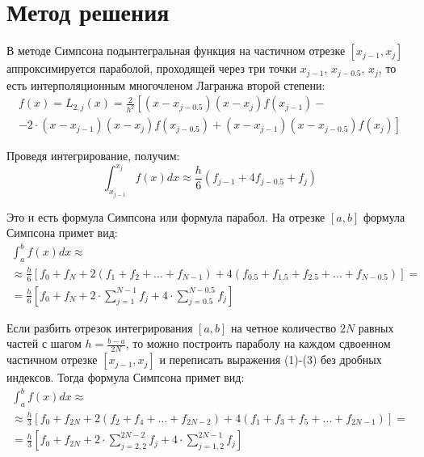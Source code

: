 \documentclass{report}
\begin{document}
\section*{Метод решения}
В методе Симпсона подынтегральная функция на частичном отрезке $\left[x_{j-1}, x_{j}\right]$ аппроксимируется параболой, проходящей через три точки $x_{j-1}$, $x_{j-0.5}$, $x_{j}$, то есть интерполяционным многочленом Лагранжа второй степени:
\begin{equation}
\begin{array}{l}
f(x)=L_{2, j}(x)=\frac{2}{h^{2}}\left[\left(x-x_{j-0.5}\right)\left(x-x_{j}\right) f\left(x_{j-1}\right)-\right. \\
\left.-2 \cdot\left(x-x_{j-1}\right)\left(x-x_{j}\right) f\left(x_{j-0.5}\right)+\left(x-x_{j-1}\right)\left(x-x_{j-0.5}\right) f\left(x_{j}\right)\right]
\end{array}
\end{equation}
\par Проведя интегрирование, получим:
\begin{equation}
\int_{x_{j-1}}^{x_{j}} f(x) d x \approx \frac{h}{6}\left(f_{j-1}+4 f_{j-0.5}+f_{j}\right)
\end{equation}
\par Это и есть формула Симпсона или формула парабол. На отрезке $[a,b]$ формула Симпсона примет вид:
\begin{equation}
\begin{array}{l}
\int_{a}^{b} f(x) d x \approx \\
\approx\frac{h}{6}\left[f_{0}+f_{N}+2\left(f_{1}+f_{2}+\ldots+f_{N-1}\right)+4\left(f_{0.5}+f_{1.5}+f_{2.5}+\ldots+f_{N-0.5}\right)\right]= \\
=\frac{h}{6}\left[f_{0}+f_{N}+2 \cdot \sum_{j=1}^{N-1} f_{j}+4 \cdot \sum_{j=0.5}^{N-0.5} f_{j}\right]
\end{array}
\end{equation}
\par Если разбить отрезок интегрирования $[a,b]$ на четное количество $2N$ равных частей с шагом $h=\frac{b-a}{2 N}$, то можно построить параболу на каждом сдвоенном частичном отрезке $\left[x_{j-1}, x_{j}\right]$ и переписать выражения (1)-(3) без дробных индексов. Тогда формула Симпсона примет вид:
\begin{equation}
\begin{array}{l}
\int_{a}^{b} f(x) d x \approx \\
\approx\frac{h}{3}\left[f_{0}+f_{2 N}+2\left(f_{2}+f_{4}+\ldots+f_{2 N-2}\right)+4\left(f_{1}+f_{3}+f_{5}+\ldots+f_{2 N-1}\right)\right]= \\
=\frac{h}{3}\left[f_{0}+f_{2 N}+2 \cdot \sum_{j=2,2}^{2 N-2} f_{j}+4 \cdot \sum_{j=1,2}^{2 N-1} f_{j}\right]
\end{array}
\end{equation}
\newpage
\end{document}
